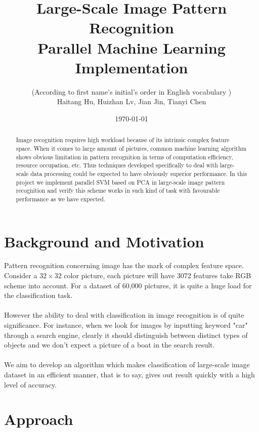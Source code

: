 \documentclass[a4paper]{article}
\title{Large-Scale Image Pattern Recognition\\
Parallel Machine Learning Implementation}
\author{(According to first name's initial's order in English vocabulary )\\
Haitang Hu, Huizhan Lv, Jian Jin, Tianyi Chen}
\date{\today}
\begin{document}
\maketitle

\begin{abstract}
Image recognition requires high workload because of its intrinsic complex feature space. When it comes to large amount of pictures, common machine learning algorithm shows obvious limitation in pattern recognition in terms of computation efficiency, resource occupation, etc. Thus techniques developed specifically to deal with large-scale data processing could be expected to have obviously superior performance. In this project we implement parallel SVM based on PCA in large-scale image pattern recognition and verify this scheme works in such kind of task with favourable performance as we have expected. 
\end{abstract}

\section{Background and Motivation}
Pattern recognition concerning image has the mark of complex feature space. Consider a $32\times 32$ color picture, each picture will have 3072 features take RGB scheme into account. For a dataset of 60,000 pictures, it is quite a huge load for the classification task.\\
\\
However the ability to deal with classification in image recognition is of quite significance. For instance, when we  look for images by inputting keyword "car" through a search engine, clearly it should distinguish between distinct types of objects and we don't expect a picture of a boat in the search result.\\
\\
We aim to develop an algorithm which makes classification of large-scale image dataset in an efficient manner, that is to say, gives out result quickly with a high level of accuracy. 
\section{Approach}
\end{document}
